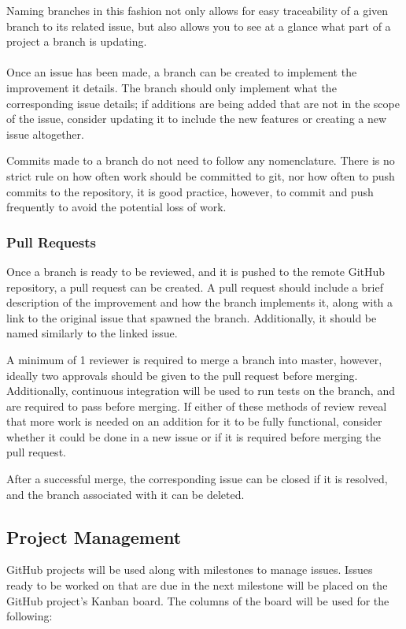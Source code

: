 \documentclass{article}
\begin{document}
Naming branches in this fashion not only allows for easy traceability of a given branch to its related issue, but also allows you to see at a glance what part of a project a branch is updating.
\\\\
Once an issue has been made, a branch can be created to implement the improvement it details. The branch should only implement what the corresponding issue details; if additions are being added that are not in the scope of the issue, consider updating it to include the new features or creating a new issue altogether.

Commits made to a branch do not need to follow any nomenclature. There is no strict rule on how often work should be committed to git, nor how often to push commits to the repository, it is good practice, however, to commit and push frequently to avoid the potential loss of work.

\subsubsection{Pull Requests}

Once a branch is ready to be reviewed, and it is pushed to the remote GitHub repository, a pull request can be created. A pull request should include a brief description of the improvement and how the branch implements it, along with a link to the original issue that spawned the branch. Additionally, it should be named similarly to the linked issue.

A minimum of 1 reviewer is required to merge a branch into master, however, ideally two approvals should be given to the pull request before merging. Additionally, continuous integration will be used to run tests on the branch, and are required to pass before merging. If either of these methods of review reveal that more work is needed on an addition for it to be fully functional, consider whether it could be done in a new issue or if it is required before merging the pull request.

After a successful merge, the corresponding issue can be closed if it is resolved, and the branch associated with it can be deleted.

\subsection{Project Management}
\label{sec:projectmngment}

GitHub projects will be used along with milestones to manage issues. Issues ready to be worked on that are due in the next milestone will be placed on the GitHub project's Kanban board. The columns of the board will be used for the following:
\end{document}
